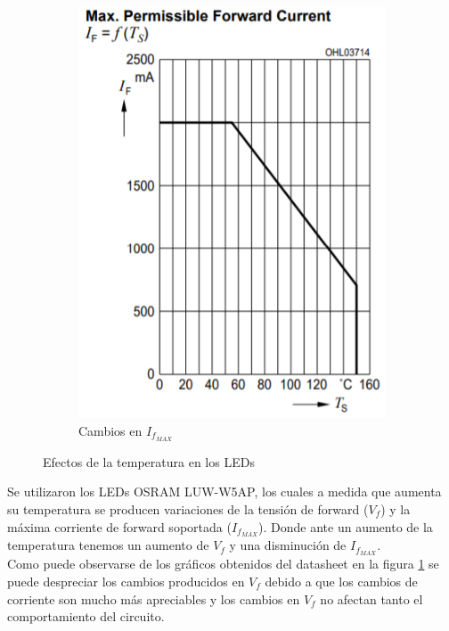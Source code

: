 \documentclass[e4-tp2-main.tex]{subfiles}
\begin{document}
\begin{figure}
\begin{subfigure}[t]{0.24\textwidth}
    	\includegraphics[width=\textwidth]{images/ej2/Cambio_If_LED.png}
    	\caption{Cambios en $I_{f_{MAX}}$}
    \end{subfigure}
    \caption{Efectos de la temperatura en los LEDs}
    \label{fig:Efec_Leds}
\end{figure}

Se utilizaron los LEDs OSRAM LUW-W5AP, los cuales a medida que aumenta su temperatura se producen variaciones de la tensión de forward ($V_f$) y la máxima corriente de forward soportada ($I_{f_{MAX}}$). Donde ante un aumento de la temperatura tenemos un aumento de $V_f$ y una disminución de $I_{f_{MAX}}$.\\

Como puede observarse de los gráficos obtenidos del datasheet en la figura \ref{fig:Efec_Leds} se puede despreciar los cambios producidos en $V_f$ debido a que los cambios de corriente son mucho más apreciables y los cambios en $V_f$ no afectan tanto el comportamiento del circuito.\\
\end{document}
